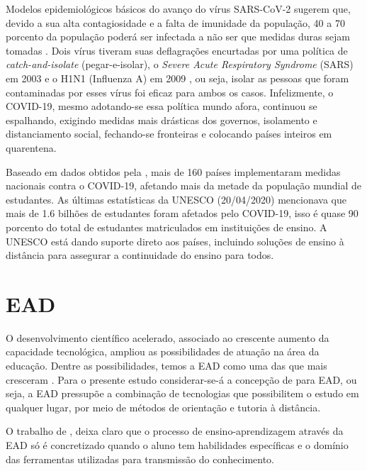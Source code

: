 \documentclass[
	arial,
	12pt,				%
	openright,			%
	oneside,
	a4paper,			%
	chapter=TITLE,		%
	english,			%
	french,				%
	spanish,			%
	brazil,				%
	]{abntex2}
\begin{document}
Modelos epidemiológicos básicos do avanço do vírus SARS-CoV-2 sugerem que, devido a sua alta contagiosidade e a falta de imunidade da população, 40 a 70 porcento da população poderá ser infectada a não ser que medidas duras sejam tomadas \cite{salathe2020covid}. Dois vírus tiveram suas deflagrações encurtadas por uma política de \textit{catch-and-isolate} (pegar-e-isolar), o \textit{Severe Acute Respiratory Syndrome} (SARS) em 2003 e o H1N1 (Influenza A) em 2009 \cite{watkins2020preventing}, ou seja, isolar as pessoas que foram contaminadas por esses vírus foi eficaz para ambos os casos. Infelizmente, o COVID-19, mesmo adotando-se essa política mundo afora, continuou se espalhando, exigindo medidas mais drásticas dos governos, isolamento e distanciamento social, fechando-se fronteiras e colocando países inteiros em quarentena. 

Baseado em dados obtidos pela , mais de 160 países implementaram medidas nacionais contra o COVID-19, afetando mais da metade da população mundial de estudantes. As últimas estatísticas da UNESCO (20/04/2020) mencionava que mais de 1.6 bilhões de estudantes foram afetados pelo COVID-19, isso é quase 90 porcento do total de estudantes matriculados em instituições de ensino. A UNESCO está dando suporte direto aos países, incluindo soluções de ensino à distância para assegurar a continuidade do ensino para todos.

\section{EAD}

O desenvolvimento científico acelerado, associado ao crescente aumento da capacidade tecnológica, ampliou as possibilidades de atuação na área da educação. Dentre as possibilidades, temos a EAD como uma das que mais cresceram \cite{jorgeEad}. Para o presente estudo considerar-se-á a concepção de  para EAD, ou seja, a EAD pressupõe a combinação de tecnologias que possibilitem o estudo em qualquer lugar, por meio de métodos de orientação e tutoria à distância.

O trabalho de , deixa claro que o processo de ensino-aprendizagem através da EAD só é concretizado quando o aluno tem habilidades específicas e o domínio das ferramentas utilizadas para transmissão do conhecimento. 
\end{document}
